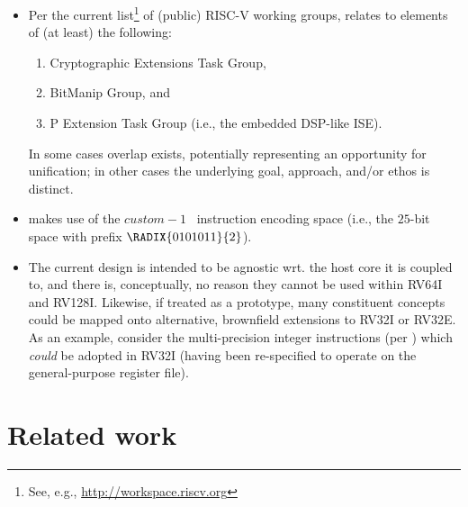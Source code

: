 \documentclass{article}
\begin{document}
\begin{itemize}

\item Per the current list\footnote{
      See, e.g., \url{http://workspace.riscv.org}
      } of (public) RISC-V working groups, 
      \ISE relates to elements of (at least) the following:

      \begin{enumerate}
      \item Cryptographic Extensions Task Group,
      \item BitManip                      Group,
            and
      \item P             Extension  Task Group (i.e., the embedded DSP-like ISE).
      \end{enumerate}

      \noindent
      In some cases overlap exists, potentially representing an opportunity
      for unification; in other cases the underlying goal, approach, and/or
      ethos is distinct.

\item \ISE makes use of the $custom-1$~\cite[Table 19.1]{SCARV:RV:ISA:I:17}
      instruction encoding space 
      (i.e., the $25$-bit space with prefix $\RADIX{0101011}{2}$).

\item The current design is intended to be agnostic wrt. the host core it
      is coupled to, and there is, conceptually, no reason they cannot be 
      used within RV64I and RV128I.
      Likewise, if treated as a prototype, many constituent concepts could
      be mapped onto alternative, brownfield extensions to RV32I or RV32E.
      As an example, consider the multi-precision integer instructions 
      (per )
      which {\em could} be adopted in RV32I (having been re-specified to
      operate on the general-purpose register file).

\end{itemize}


\section{Related work}

\cite{SCARV:Gutmann:00}
\cite{SCARV:FazLopOli:18}
\cite{SCARV:RegIen:16}
\cite{SCARV:BarGioMar:09}
\end{document}
